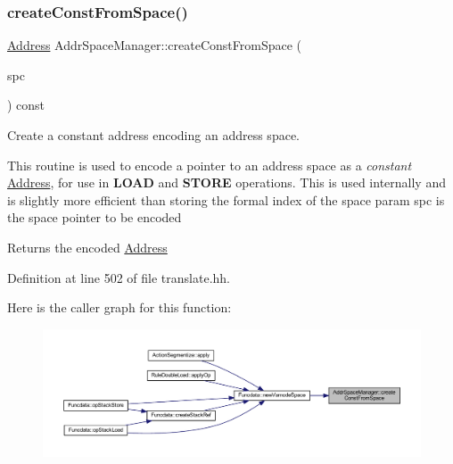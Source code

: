 \subsubsection{\texorpdfstring{createConstFromSpace()}{createConstFromSpace()}}
{\footnotesize\ttfamily \mbox{\hyperlink{class_address}{Address}} Addr\+Space\+Manager\+::create\+Const\+From\+Space (\begin{DoxyParamCaption}\item[{\mbox{\hyperlink{class_addr_space}{Addr\+Space}} $\ast$}]{spc }\end{DoxyParamCaption}) const\hspace{0.3cm}{\ttfamily [inline]}}



Create a constant address encoding an address space. 

This routine is used to encode a pointer to an address space as a {\itshape constant} \mbox{\hyperlink{class_address}{Address}}, for use in {\bfseries{L\+O\+AD}} and {\bfseries{S\+T\+O\+RE}} operations. This is used internally and is slightly more efficient than storing the formal index of the space param spc is the space pointer to be encoded \begin{DoxyReturn}{Returns}
the encoded \mbox{\hyperlink{class_address}{Address}} 
\end{DoxyReturn}


Definition at line 502 of file translate.\+hh.

Here is the caller graph for this function\+:
\nopagebreak
\begin{figure}[H]
\begin{center}
\leavevmode
\includegraphics[width=350pt]{class_addr_space_manager_a5dc6c782b2b4c4c300aaa491e40719b8_icgraph}
\end{center}
\end{figure}
\mbox{\label{class_addr_space_manager_a1b9e7e934e22b6bea3b2b949fd2b2159}} 
